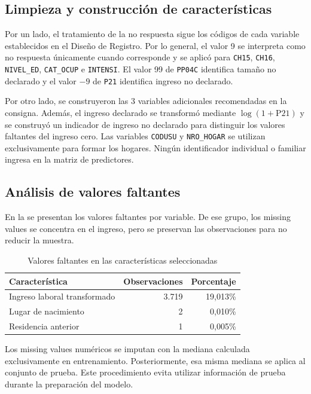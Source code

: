 \subsection{Limpieza y construcción de características}
Por un lado, el tratamiento de la no respuesta sigue los códigos de cada variable establecidos en el Diseño de Registro. Por lo general, el valor 9 se interpreta como no respuesta únicamente cuando corresponde y se aplicó para \texttt{CH15}, \texttt{CH16}, \texttt{NIVEL\_ED}, \texttt{CAT\_OCUP} e \texttt{INTENSI}. El valor 99 de \texttt{PP04C} identifica tamaño no declarado y el valor $-9$ de \texttt{P21} identifica ingreso no declarado.

Por otro lado, se construyeron las 3 variables adicionales recomendadas en la consigna. Además, el ingreso declarado se transformó mediante $\log(1+\mathrm{P21})$ y se construyó un indicador de ingreso no declarado para distinguir los valores faltantes del ingreso cero. Las variables \texttt{CODUSU} y \texttt{NRO\_HOGAR} se utilizan exclusivamente para formar los hogares. Ningún identificador individual o familiar ingresa en la matriz de predictores.

\subsection{Análisis de valores faltantes}
En la  se presentan los valores faltantes por variable. De ese grupo, los missing values se concentra en el ingreso, pero se preservan las observaciones para no reducir la muestra.
\begin{table}[H]
\centering
\caption{Valores faltantes en las características seleccionadas}
\label{tab:faltantes_parte01}
\begin{tabular}{lrr}
\hline
\textbf{Característica} & \textbf{Observaciones} & \textbf{Porcentaje} \\
\hline
Ingreso laboral transformado & 3.719 & 19,013\% \\
Lugar de nacimiento & 2 & 0,010\% \\
Residencia anterior & 1 & 0,005\% \\
\hline
\end{tabular}
\end{table}
Los missing values numéricos se imputan con la mediana calculada exclusivamente en entrenamiento. Posteriormente, esa misma mediana se aplica al conjunto de prueba. Este procedimiento evita utilizar información de prueba durante la preparación del modelo.

